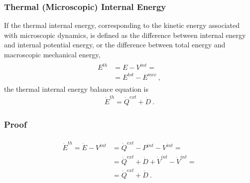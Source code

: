 \documentclass[letterpaper,10pt,english]{jupyterBook}
\begin{document}
\subsubsection{Thermal (Microscopic) Internal Energy}
\label{\detokenize{ch/circuits-electromechanic:thermal-microscopic-internal-energy}}
\sphinxAtStartPar
If the thermal internal energy, corresponding to the kinetic energy associated with microscopic dynamics, is defined as the difference between internal energy and internal potential energy, or the difference between total energy and macroscopic mechanical energy,
\begin{equation*}
\begin{split}\begin{aligned}
  E^{th} & = E - V^{int} = \\
         & = E^{tot} - E^{mec} \ ,
\end{aligned}\end{split}
\end{equation*}
\sphinxAtStartPar
the thermal internal energy balance equation is
\begin{equation*}
\begin{split}   \dot{E}^{th} = \dot{Q}^{ext} + \dot{D} \ . \end{split}
\end{equation*}\subsubsection*{Proof}
\begin{equation*}
\begin{split}\begin{aligned}
  \dot{E}^{th} = \dot{E} - V^{int}
    & = \dot{Q}^{ext} - P^{int} - V^{int} = \\
    & = \dot{Q}^{ext} + \dot{D} + \dot{V}^{int} - \dot{V}^{int} = \\
    & = \dot{Q}^{ext} + \dot{D} \ .
\end{aligned}\end{split}
\end{equation*}
\sphinxAtStartPar
{} 
\end{document}
